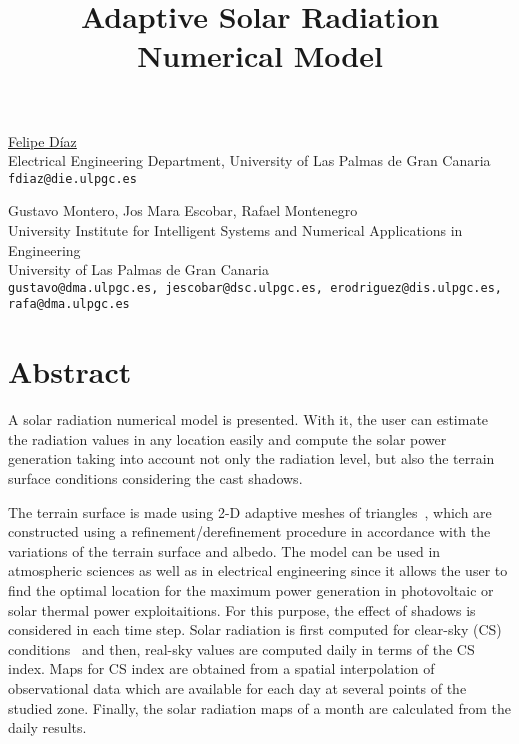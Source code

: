 \title{Adaptive Solar Radiation Numerical Model}
\author{} \institute{}
\maketitle

\begin{center}
{\large \underline{Felipe D\' iaz}}\\
Electrical Engineering Department, University of Las Palmas de Gran Canaria\\
{\tt fdiaz@die.ulpgc.es}\\
\vspace{4mm}

{\large Gustavo Montero, Jos Mara Escobar, Rafael Montenegro}\\
University Institute for Intelligent Systems and Numerical Applications in Engineering\\
University of Las Palmas de Gran Canaria\\
{\tt gustavo@dma.ulpgc.es, jescobar@dsc.ulpgc.es, erodriguez@dis.ulpgc.es, rafa@dma.ulpgc.es}
\end{center}

\section*{Abstract}
A solar radiation numerical model is presented. With it, the user can estimate the radiation values in any location easily and compute the solar power generation taking into account not only the radiation level, but also the terrain surface conditions considering the cast shadows.

The terrain surface is made using 2-D adaptive meshes of triangles~\cite{Montero}, which are constructed using a refinement/derefinement procedure in accordance with the variations of the terrain surface and albedo. The model can be used in atmospheric sciences as well as in electrical engineering since it allows the user to find the optimal location for the maximum power generation in photovoltaic or solar thermal power exploitaitions. For this purpose, the effect of shadows is considered in each time step. Solar radiation is first computed for clear-sky (CS) conditions~\cite{Suri} and then, real-sky values are computed daily in terms of the CS index. Maps for CS index are obtained from a spatial interpolation of observational data which are available for each day at several points of the studied zone. Finally, the solar radiation maps of a month are calculated from the daily results.

